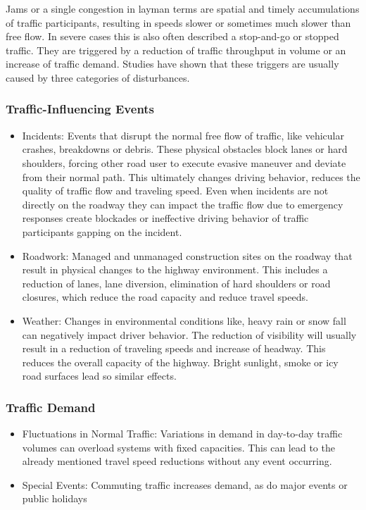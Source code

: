 \documentclass[a4paper,12pt]{report}
\begin{document}
\bigskip

Jams or a single congestion in layman terms are spatial and timely accumulations of traffic participants, resulting in speeds slower or sometimes much slower than free flow. In severe cases this is also often described a stop-and-go or stopped traffic. They are triggered by a reduction of traffic throughput in volume or an increase of traffic demand. Studies have shown that these triggers are usually caused by three categories of disturbances. \cite{TRB2003}

\subsubsection{Traffic-Influencing Events}

\begin{itemize}
	\item Incidents: Events that disrupt the normal free flow of traffic, like vehicular crashes, breakdowns or debris. These physical obstacles block lanes or hard shoulders, forcing other road user to execute evasive maneuver and deviate from their normal path. This ultimately changes driving behavior, reduces the quality of traffic flow and traveling speed. Even when incidents are not directly on the roadway they can impact the traffic flow due to emergency responses create blockades or ineffective driving behavior of traffic participants gapping on the incident.
	\item Roadwork: Managed and unmanaged construction sites on the roadway that result in physical changes to the highway environment. This includes a reduction of lanes, lane diversion, elimination of hard shoulders or road closures, which reduce the road capacity and reduce travel speeds.
	\item Weather: Changes in environmental conditions like, heavy rain or snow fall can negatively impact driver behavior. The reduction of visibility will usually result in a reduction of traveling speeds and increase of headway. This reduces the overall capacity of the highway. Bright sunlight, smoke or icy road surfaces lead so similar effects.
\end{itemize}

\subsubsection{Traffic Demand}

\begin{itemize}
	\item Fluctuations in Normal Traffic: Variations in demand in day-to-day traffic volumes can overload systems with fixed capacities. This can lead to the already mentioned travel speed reductions without any event occurring.
	\item Special Events: Commuting traffic increases demand, as do major events or public holidays
\end{itemize}
\end{document}

